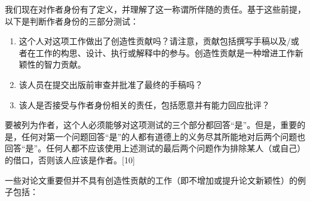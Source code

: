 我们现在对作者身份有了定义，并理解了这一称谓所伴随的责任。基于这些前提，以下是判断作者身份的三部分测试：

\begin{enumerate}
\item 这个人对这项工作做出了创造性贡献吗？请注意，贡献包括撰写手稿以及/或者在工作的构思、设计、执行或解释中的参与。创造性贡献是一种增进工作新颖性的智力贡献。

\item 该人员在提交出版前审查并批准了最终的手稿吗？

\item 该人是否接受与作者身份相关的责任，包括愿意并有能力回应批评？

\end{enumerate}

要被列为作者，这个人必须能够对这项测试的三个部分都回答“是”。但是，重要的是，任何对第一个问题回答“是”的人都有道德上的义务尽其所能地对后两个问题也回答“是”。任何人都不应该使用上述测试的最后两个问题作为排除某人（或自己）的借口，否则该人应该是作者。[10]

一些对论文重要但并不具有创造性贡献的工作（即不增加或提升论文新颖性）的例子包括：

